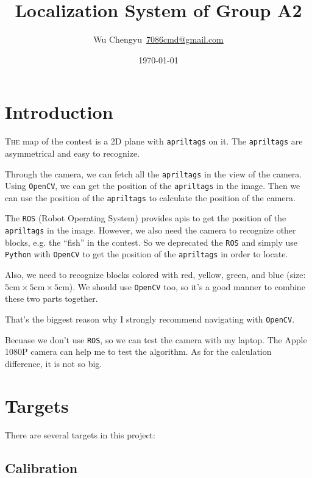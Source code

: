 \documentclass{article}
\title{Localization System of Group A2}
\author{Wu Chengyu\ \url{7086cmd@gmail.com}}
\date{\today}
\begin{document}
\maketitle

\newpage

\tableofcontents

\newpage

\section{Introduction}

\lettrine{T}{he} map of the contest is a 2D plane with \texttt{apriltags} on it. The \texttt{apriltags} are asymmetrical and easy to recognize.

Through the camera, we can fetch all the \texttt{apriltags} in the view of the camera. Using \texttt{OpenCV}, we can get the position of the \texttt{apriltags} in the image. Then we can use the position of the \texttt{apriltags} to calculate the position of the camera.

The \texttt{ROS} (Robot Operating System) provides apis to get the position of the \texttt{apriltags} in the image. However, we also need the camera to recognize other blocks, e.g. the ``fish'' in the contest. So we deprecated the \texttt{ROS} and simply use \texttt{Python} with \texttt{OpenCV} to get the position of the \texttt{apriltags} in order to locate.

Also, we need to recognize blocks colored with red, yellow, green, and blue (size: $5\mathrm{cm}\times5\mathrm{cm}\times5\mathrm{cm}$). We should use \texttt{OpenCV} too, so it's a good manner to combine these two parts together.

That's the biggest reason why I strongly recommend navigating with \texttt{OpenCV}.

Becuase we don't use \texttt{ROS}, so we can test the camera with my laptop. The Apple 1080P camera can help me to test the algorithm. As for the calculation difference, it is not so big.


\section{Targets}

There are several targets in this project:

\subsection{Calibration}
\end{document}
